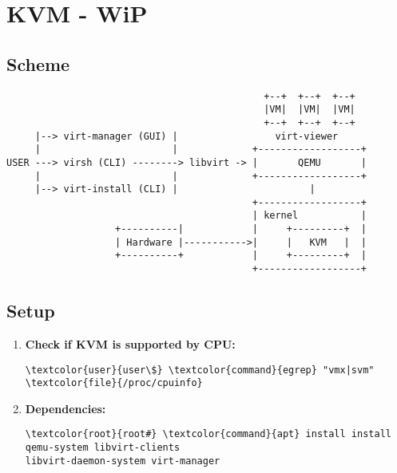 \documentclass[10pt, a4paper, onecolumn, openany]{book} %
\begin{document}
\chapter{KVM - WiP}
\section{Scheme}
\begin{verbatim}
                                             +--+  +--+  +--+
                                             |VM|  |VM|  |VM|
                                             +--+  +--+  +--+
     |--> virt-manager (GUI) |                 virt-viewer
     |                       |             +------------------+
USER ---> virsh (CLI) --------> libvirt -> |       QEMU       |
     |                       |             +------------------+
     |--> virt-install (CLI) |                       |
                                           +------------------+
                                           | kernel           |
                   +----------|            |     +---------+  |
                   | Hardware |----------->|     |   KVM   |  |
                   +----------+            |     +---------+  |
                                           +------------------+
\end{verbatim}
\section{Setup}
\begin{enumerate}
    \item \textbf{Check if KVM is supported by CPU:}
\begin{Verbatim}[commandchars=\\\{\}]
\textcolor{user}{user\$} \textcolor{command}{egrep} "vmx|svm" \textcolor{file}{/proc/cpuinfo}
\end{Verbatim}
    \item \textbf{Dependencies:}
\begin{Verbatim}[commandchars=\\\{\}]
\textcolor{root}{root#} \textcolor{command}{apt} install install qemu-system libvirt-clients 
libvirt-daemon-system virt-manager
\end{Verbatim}
\end{enumerate}
\end{document}
